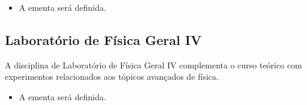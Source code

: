 \documentclass[a4paper, 12pt]{article}
\newcounter{fis}
\begin{document}
\begin{tcolorbox}[title=Ementa:]
    \begin{itemize}
        \item A ementa será definida.
    \end{itemize}
\end{tcolorbox}

\subsection{Laboratório de Física Geral IV}
\label{fis013}

A disciplina de Laboratório de Física Geral IV complementa o curso teórico com
experimentos relacionados aos tópicos avançados de física.

\begin{tcolorbox}[title=Ementa:]
    \begin{itemize}
        \item A ementa será definida.
    \end{itemize}
\end{tcolorbox}
\end{document}
